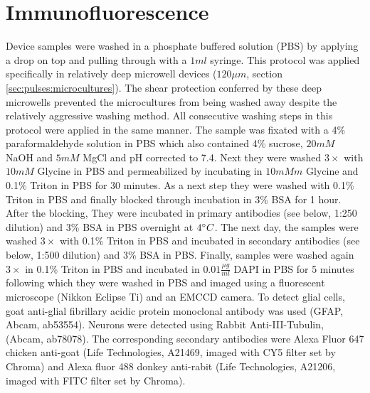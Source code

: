  \section{Immunofluorescence}
Device samples were washed in a phosphate buffered solution (PBS) by applying a drop on top and pulling through with a \(1ml\) syringe. This protocol was applied specifically in relatively deep microwell devices (\(120\mu m\), section \ref{sec:pulses:microcultures}). The shear protection conferred by these deep microwells prevented the microcultures from being washed away despite the relatively aggressive washing method. All consecutive washing steps in this protocol were applied in the same manner. The sample was fixated with a 4\% paraformaldehyde solution in PBS which also contained 4\% sucrose, \(20mM\) NaOH and \(5mM\) MgCl and pH corrected to 7.4. Next they were washed \(3\times\) with \(10mM\) Glycine in PBS and permeabilized by incubating in \(10mMm\) Glycine and 0.1\% Triton in PBS for 30 minutes.  As a next step they were washed with 0.1\% Triton in PBS and finally blocked through incubation in 3\% BSA for 1 hour. After the blocking, They were  incubated in primary antibodies (see below, 1:250 dilution) and 3\% BSA in PBS overnight at \(4\degree C\). The next day, the samples were washed \(3\times\) with 0.1\% Triton in PBS and incubated in secondary antibodies (see below, 1:500 dilution) and 3\% BSA in PBS. Finally, samples were washed again \(3\times\) in 0.1\% Triton in PBS and incubated in \(0.01 \frac{\mu g}{ml}\) DAPI in PBS for 5 minutes following which they were washed in PBS and imaged using a fluorescent microscope (Nikkon Eclipse Ti) and an EMCCD camera. To detect glial cells, goat anti-glial fibrillary acidic protein monoclonal antibody was used (GFAP, Abcam, ab53554). Neurons were detected using Rabbit Anti-\textbeta III-Tubulin, (Abcam, ab78078). The corresponding secondary antibodies were Alexa Fluor 647 chicken anti-goat (Life Technologies, A21469, imaged with CY5 filter set by Chroma) and Alexa fluor 488 donkey anti-rabit (Life Technologies, A21206, imaged with FITC filter set by Chroma).




